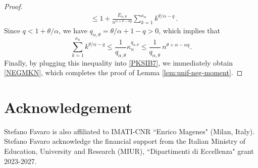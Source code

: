 \documentclass[twoside,12pt]{article}
\begin{document}
\begin{proof}
\begin{align}
&\leq 1+ \frac{E_{\alpha, \theta}}{n^{\alpha+\theta - \alpha q}} \sum_{k=1}^{\kappa_n}  k^{\theta/\alpha -q}\,.
\label{PKSIB7}
\end{align}
Since $q<1+\theta/\alpha$, we have $q_{\alpha,\theta}=\theta/\alpha+1-q>0$, which implies that
\begin{displaymath}
\sum_{k=1}^{\kappa_n}  k^{\theta/\alpha -q}\le \frac{1}{q_{\alpha,\theta}}\kappa_n^{q_{\alpha,\theta}}
\leq \frac{1}{q_{\alpha,\theta}}\,n^{\theta+\alpha-\alpha q}.
\end{displaymath}
Finally, by plugging this inequality into \eqref{PKSIB7}, we immediately obtain \eqref{NEGMKN}, which completes the proof of Lemma 
\ref{lem:unif-neg-moment}.
\end{proof}


\section*{Acknowledgement}

Stefano Favaro is also affiliated to IMATI-CNR ``Enrico  Magenes" (Milan, Italy). Stefano Favaro acknowledge the financial support from the Italian Ministry of Education, University and Research (MIUR), ``Dipartimenti di Eccellenza" grant 2023-2027. 

\end{document}
